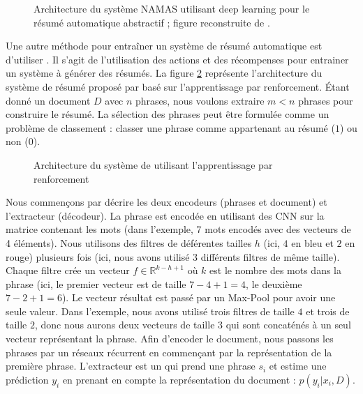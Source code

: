 \documentclass{KodeBook}
\begin{document}
\begin{figure}[!ht]
	\centering
	\caption[Architecture du système NAMAS (résumé automatique)]{Architecture du système NAMAS utilisant deep learning pour le résumé automatique abstractif ; figure reconstruite de \cite{15-rush-al}.}
	\label{fig:ats-namas} 
\end{figure}

Une autre méthode pour entraîner un système de résumé automatique est d'utiliser . 
Il s'agit de l'utilisation des actions et des récompenses pour entrainer un système à générer des résumés.
La figure \ref{fig:ats-narayan} représente l'architecture du système de résumé proposé par \citet{18-narayan-al} basé sur l'apprentissage par renforcement.
Étant donné un document $D$ avec $n$ phrases, nous voulons extraire $m < n$ phrases pour construire le résumé. 
La sélection des phrases peut être formulée comme un problème de classement : classer une phrase comme appartenant au résumé ($1$) ou non ($0$).

\begin{figure}[!ht]
	\centering
	\caption[Architecture de résumé automatique par renforcement]{Architecture du système de \citet{18-narayan-al} utilisant l'apprentissage par renforcement}
	\label{fig:ats-narayan}
\end{figure}

Nous commençons par décrire les deux encodeurs (phrases et document) et l'extracteur (décodeur).
La phrase est encodée en utilisant des CNN sur la matrice contenant les mots (dans l'exemple, 7 mots encodés avec des vecteurs de 4 éléments). 
Nous utilisons des filtres de déférentes tailles $h$ (ici, $4$ en bleu et $2$ en rouge) plusieurs fois (ici, nous avons utilisé $3$ différents filtres de même taille). 
Chaque filtre crée un vecteur $f \in \mathbb{R}^{k-h+1}$ où $k$ est le nombre des mots dans la phrase (ici, le premier vecteur est de taille $7-4+1 = 4$, le deuxième $7-2+1 = 6$). 
Le vecteur résultat est passé par un Max-Pool pour avoir une seule valeur. 
Dans l'exemple, nous avons utilisé trois filtres de taille $4$ et trois de taille $2$, donc nous aurons deux vecteurs de  taille $3$ qui sont concaténés à un seul vecteur représentant la phrase.
Afin d'encoder le document, nous passons les phrases par un réseaux récurrent  en commençant par la représentation de la première phrase.
L'extracteur est un  qui prend une phrase $s_i$ et estime une prédiction $y_i$ en prenant en compte la représentation du document : $p(y_i|x_i, D)$.
\end{document}
